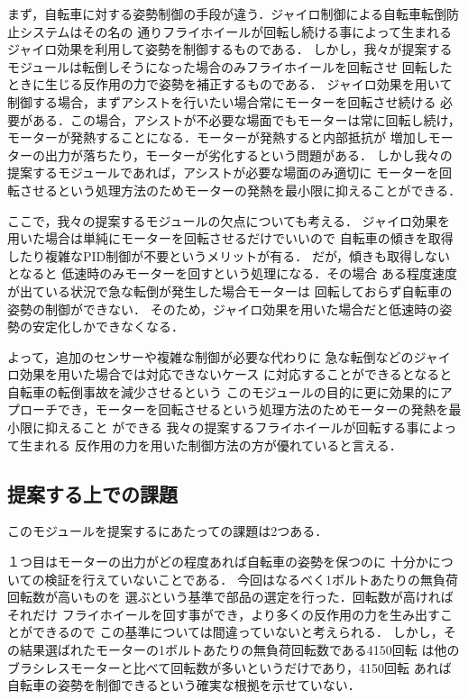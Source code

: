 \documentclass[uplatex,dvipdfmx]{jsarticle}
\begin{document}
まず，自転車に対する姿勢制御の手段が違う．ジャイロ制御による自転車転倒防止システムはその名の
通りフライホイールが回転し続ける事によって生まれるジャイロ効果を利用して姿勢を制御するものである．
しかし，我々が提案するモジュールは転倒しそうになった場合のみフライホイールを回転させ
回転したときに生じる反作用の力で姿勢を補正するものである．
ジャイロ効果を用いて制御する場合，まずアシストを行いたい場合常にモーターを回転させ続ける
必要がある．この場合，アシストが不必要な場面でもモーターは常に回転し続け，
モーターが発熱することになる．モーターが発熱すると内部抵抗が
増加しモーターの出力が落ちたり，モーターが劣化するという問題がある．
しかし我々の提案するモジュールであれば，アシストが必要な場面のみ適切に
モーターを回転させるという処理方法のためモーターの発熱を最小限に抑えることができる．


ここで，我々の提案するモジュールの欠点についても考える．
ジャイロ効果を用いた場合は単純にモーターを回転させるだけでいいので
自転車の傾きを取得したり複雑なPID制御が不要というメリットが有る．
だが，傾きも取得しないとなると
低速時のみモーターを回すという処理になる．その場合
ある程度速度が出ている状況で急な転倒が発生した場合モーターは
回転しておらず自転車の姿勢の制御ができない．
そのため，ジャイロ効果を用いた場合だと低速時の姿勢の安定化しかできなくなる．

よって，追加のセンサーや複雑な制御が必要な代わりに
急な転倒などのジャイロ効果を用いた場合では対応できないケース
に対応することができるとなると自転車の転倒事故を減少させるという
このモジュールの目的に更に効果的にアプローチでき，モーターを回転させるという処理方法のためモーターの発熱を最小限に抑えること
ができる
我々の提案するフライホイールが回転する事によって生まれる
反作用の力を用いた制御方法の方が優れていると言える．




\subsection{提案する上での課題}
このモジュールを提案するにあたっての課題は2つある．

１つ目はモーターの出力がどの程度あれば自転車の姿勢を保つのに
十分かについての検証を行えていないことである．
今回はなるべく1ボルトあたりの無負荷回転数が高いものを
選ぶという基準で部品の選定を行った．回転数が高ければそれだけ
フライホイールを回す事ができ，より多くの反作用の力を生み出すことができるので
この基準については間違っていないと考えられる．
しかし，その結果選ばれたモーターの1ボルトあたりの無負荷回転数である4150回転
は他のブラシレスモーターと比べて回転数が多いというだけであり，4150回転
あれば自転車の姿勢を制御できるという確実な根拠を示せていない．
\end{document}
